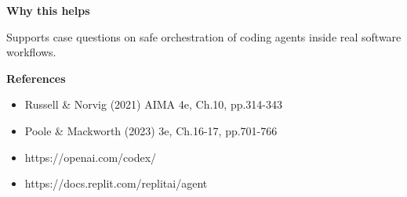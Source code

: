 \documentclass[11pt]{article}
\begin{document}
\begin{tcolorbox}[colback=white,colframe=MidnightBlue,title={Q4 Collaborative Mini-Case},fonttitle=\bfseries,breakable]
{\large\bfseries\color{MidnightBlue} Why this helps}\par\medskip
Supports case questions on safe orchestration of coding agents inside real software workflows.

{\large\bfseries\color{MidnightBlue} References}\par\medskip
\begin{itemize}\item Russell \& Norvig (2021) AIMA 4e, Ch.10, pp.314-343
\item Poole \& Mackworth (2023) 3e, Ch.16-17, pp.701-766
\item https://openai.com/codex/
\item https://docs.replit.com/replitai/agent\end{itemize}
\end{tcolorbox}
\end{document}
